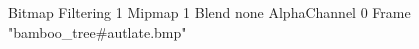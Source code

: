 {Bitmap
	{Filtering 1}
	{Mipmap 1}
	{Blend none}
	{AlphaChannel 0}
	{Frame "bamboo_tree#autlate.bmp"}
}
